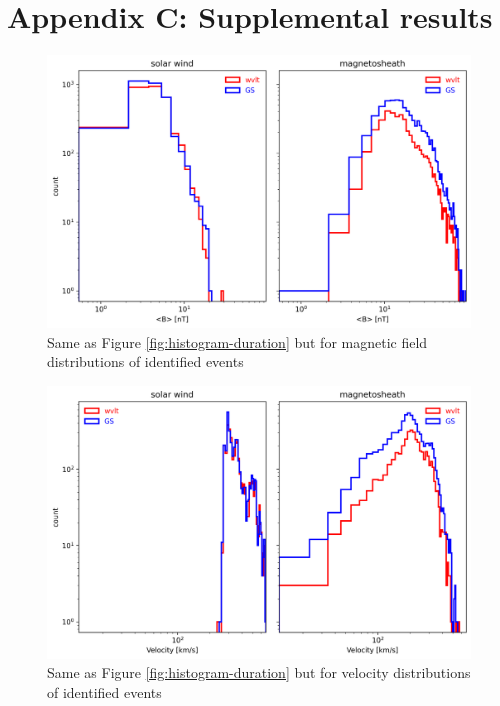 \chapter{Appendix C: Supplemental results}\label{appendix:supplemental-results}


\renewcommand{\thechapter}{C}
\renewcommand{\thefigure}{C.\arabic{figure}}
\setcounter{figure}{0}

\begin{figure}
    \centering
    \includegraphics[width=\textwidth]{Figures/Histograms/histogram_Bfield.png}
    \caption[Histogram of average magnetic field for identified events]{Same as Figure \ref{fig:histogram-duration} but for magnetic field distributions of identified events}
    \label{fig:histogram-Bfield}
\end{figure}

\begin{figure}
    \centering
    \includegraphics[width=\textwidth]{Figures/Histograms/histogram_velocity.png}
    \caption[Histogram of velocity for identified events]{Same as Figure \ref{fig:histogram-duration} but for velocity distributions of identified events}
    \label{fig:histogram-velocity}
\end{figure}

